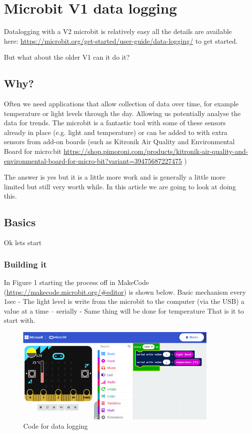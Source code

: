 \chapter{Microbit V1 data logging}
Datalogging with a V2 microbit is relatively easy all the details are available here: \url{https://microbit.org/get-started/user-guide/data-logging/} to get started. 

But what about the older V1 can it do it?
\section{Why?}
Often we need applications that allow collection of data over time, for example temperature or light levels through the day. Allowing us potentially analyse the data for trends. The microbit is a fantastic tool with some of these sensors already in place (e.g. light and temperature) or can be added to with extra sensors from add-on boards (such as Kitronik Air Quality and Environmental Board for micro:bit \url{https://shop.pimoroni.com/products/kitronik-air-quality-and-environmental-board-for-micro-bit?variant=39475687227475} )



The answer is yes but it is a little more work and is generally a little more limited but still very worth while. In this article we are going to look at doing this.

\section{Basics}
Ok lets start
\subsection{Building it}
In Figure 1 starting the process off in MakeCode (\url{https://makecode.microbit.org/#editor}) is shown below. Basic mechanism every 1sec 
-	The light level is write from the microbit to the computer (via the USB) a value at a time – serially
-	Same thing will be done for temperature
That is it to start with.
\begin{figure}
    \centering
    \includegraphics[width=10cm]{chapters/ChapterP2-datalog/figures/datalog1.png}
    \caption{Code for data logging}
    \label{fig:datalog1}
\end{figure}
 
